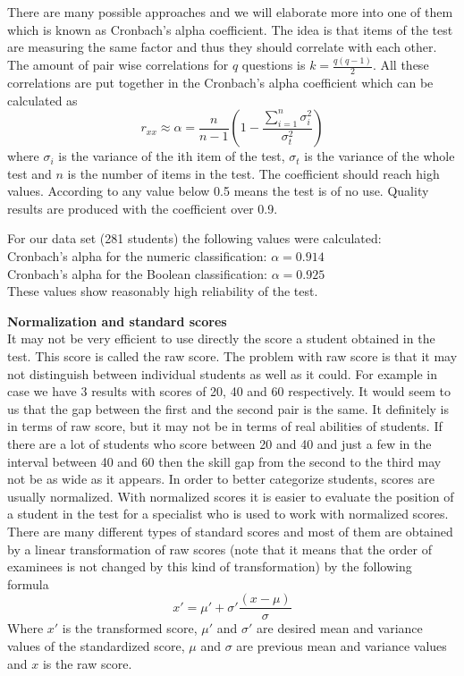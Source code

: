 There are many possible approaches and we will elaborate more into one of them which is known as Cronbach’s alpha coefficient. The idea is that items of the test are measuring the same factor and thus they should correlate with each other. The amount of pair wise correlations for $q$ questions is ${k=\frac{q(q-1)}{2}}$. All these correlations are put together in the Cronbach’s alpha coefficient which can be calculated as
$$r_{xx}\approx\alpha=\frac{n}{n-1}\left(1-\frac{\sum_{i=1}^{n}\sigma_i^2}{\sigma_t^2}\right)$$
where $\sigma_i$ is the variance of the ith item of the test, $\sigma_t$ is the variance of the whole test and $n$ is the number of items in the test. The coefficient should reach high values. According to \cite{1964psychometrics} any value below 0.5 means the test is of no use. Quality results are produced with the coefficient over 0.9.

For our data set (281 students) the following values were calculated:\\
Cronbach’s alpha for the numeric classification: $\alpha = 0.914$\\
Cronbach’s alpha for the Boolean classification: $\alpha = 0.925$\\
These values show reasonably high reliability of the test.

\textbf{Normalization and standard scores}\\
It may not be very efficient to use directly the score a student obtained in the test. This score is called the raw score. The problem with raw score is that it may not distinguish between individual students as well as it could. For example in case we have 3 results with scores of 20, 40 and 60 respectively. It would seem to us that the gap between the first and the second pair is the same. It definitely is in terms of raw score, but it may not be in terms of real abilities of students. If there are a lot of students who score between 20 and 40 and just a few in the interval between 40 and 60 then the skill gap from the second to the third may not be as wide as it appears. In order to better categorize students, scores are usually normalized. With normalized scores it is easier to evaluate the position of a student in the test for a specialist who is used to work with normalized scores. There are many different types of standard scores and most of them are obtained by a linear transformation of raw scores (note that it means that the order of examinees is not changed by this kind of transformation) by the following formula
$$x'=\mu'+\sigma'\frac{(x-\mu)}{\sigma}$$  
Where $x'$ is the transformed score, $\mu'$ and $\sigma'$ are desired mean and variance values of the standardized score, $\mu$ and $\sigma$ are previous mean and variance values and $x$ is the raw score. 

